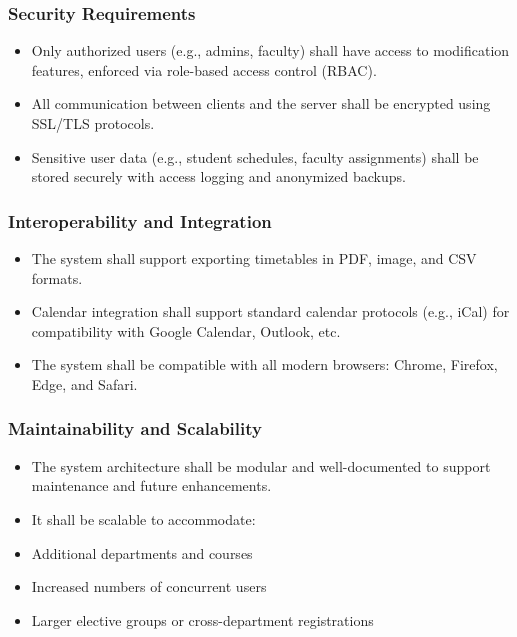 \documentclass[a4paper,12pt]{article}
\begin{document}
\subsubsection{Security Requirements}
\begin{itemize}
\item Only authorized users (e.g., admins, faculty) shall have access to modification features, enforced via role-based access control (RBAC).

\item All communication between clients and the server shall be encrypted using SSL/TLS protocols.

\item Sensitive user data (e.g., student schedules, faculty assignments) shall be stored securely with access logging and anonymized backups.
\end{itemize}

\subsubsection{Interoperability and Integration}
\begin{itemize}
\item The system shall support exporting timetables in PDF, image, and CSV formats.

\item Calendar integration shall support standard calendar protocols (e.g., iCal) for compatibility with Google Calendar, Outlook, etc.

\item The system shall be compatible with all modern browsers: Chrome, Firefox, Edge, and Safari.
\end{itemize}

\subsubsection{Maintainability and Scalability}
\begin{itemize}
\item The system architecture shall be modular and well-documented to support maintenance and future enhancements.

\item It shall be scalable to accommodate:

\item Additional departments and courses

\item Increased numbers of concurrent users

\item Larger elective groups or cross-department registrations
\end{itemize}
\end{document}
